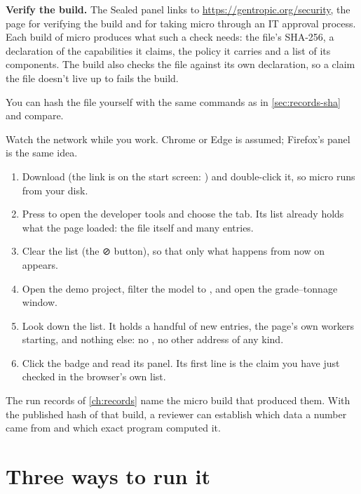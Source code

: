 \textbf{Verify the build.} The Sealed panel links to \url{https://gentropic.org/security}, the page for verifying the build and for taking micro through an IT approval process. Each build of micro produces what such a check needs: the file's SHA-256, a declaration of the capabilities it claims, the policy it carries and a list of its components. The build also checks the file against its own declaration, so a claim the file doesn't live up to fails the build.

You can hash the file yourself with the same commands as in \cref{sec:records-sha} and compare.

\begin{tryit}
Watch the network while you work. Chrome or Edge is assumed; Firefox's panel is the same idea.
\begin{enumerate}
\item Download  (the link is on the start screen: ) and double-click it, so micro runs from your disk.
\item Press  to open the developer tools and choose the  tab. Its list already holds what the page loaded: the file itself and many  entries.
\item Clear the list (the ⊘ button), so that only what happens from now on appears.
\item Open the demo project, filter the model to , and open the grade–tonnage window.
\item Look down the list. It holds a handful of new  entries, the page's own workers starting, and nothing else: no , no other address of any kind.
\item Click the  badge and read its panel. Its first line is the claim you have just checked in the browser's own list.
\end{enumerate}
\end{tryit}

\begin{note}
The run records of \cref{ch:records} name the micro build that produced them. With the published hash of that build, a reviewer can establish which data a number came from and which exact program computed it.
\end{note}

\section{Three ways to run it}\label{sec:sealed-run}

